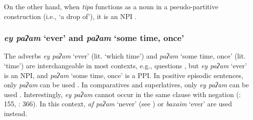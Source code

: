 \documentclass[output=paper,colorlinks,citecolor=brown]{langscibook}
\begin{document}
\ea\label{ex:heb:39}
    \z 
\z 

On the other hand, when \textit{tipa} functions as a noun in a pseudo{}-partitive construction (i.e., ‘a drop of’), it is an NPI .

\ea\label{ex:heb:40}
    \z 
\z 

\subsubsection{\textit{ey paʔam} ‘ever’ and \textit{paʔam} ‘some time, once’} \label{sec:heb:4.2.3}

The adverbs \textit{ey paʔam} ‘ever’ (lit. ‘which time’) and \textit{paʔam} ‘some time, once’ (lit. ‘time’) are interchangeable in most contexts, e.g., questions , but \textit{ey paʔam} ‘ever’ is an NPI, and \textit{paʔam} ‘some time, once’ is a PPI. In positive episodic sentences, only \textit{paʔam} can be used . In comparatives and superlatives, only \textit{ey paʔam} can be used . Interestingly, \textit{ey paʔam} cannot occur in the same clause with negation  (\citealt{Tzivoni1993}: 155, \citealt{FrancezGoldring2012}: 366). In this context, \textit{af paʔam} ‘never’ (see ) or \textit{baxaim} ‘ever’ are used instead. 
\end{document}
